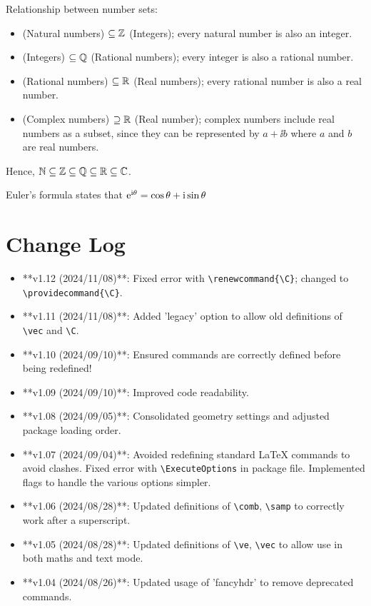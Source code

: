 \documentclass[twoside]{article}
\begin{document}
\begin{center}
    \begin{minipage}{0.7\textwidth}
        Relationship between number sets:
        \begin{itemize}
          \item \N{} (Natural numbers) $\subseteq \mathbb{Z}$ (Integers); every natural number is also an integer.
          \item \Z{} (Integers) $\subseteq \mathbb{Q}$ (Rational numbers); every integer is also a rational number.
          \item \Q{} (Rational numbers) $\subseteq \mathbb{R}$ (Real numbers); every rational number is also a real number.
          \item \Complex{} (Complex numbers) $\supseteq \mathbb{R}$ (Real number); complex numbers include real numbers as a subset, since they can be represented by $a+\ii b$ where $a$ and $b$ are real numbers.
        \end{itemize}
        Hence, $\mathbb{N}\subseteq\mathbb{Z}\subseteq\mathbb{Q}\subseteq\mathbb{R}\subseteq\mathbb{C}$.
        
        Euler's formula states that $\mathrm{e}^{\mathrm{i}\theta} = \cos\theta + \mathrm{i}\sin\theta$
    \end{minipage}
\end{center}
\section{Change Log}

\begin{itemize}
\item **v1.12 (2024/11/08)**: Fixed error with \verb|\renewcommand{\C}|; changed to \verb|\providecommand{\C}|.
\item **v1.11 (2024/11/08)**: Added 'legacy' option to allow old definitions of \verb|\vec| and \verb|\C|.
\item **v1.10 (2024/09/10)**: Ensured commands are correctly defined before being redefined!
\item **v1.09 (2024/09/10)**: Improved code readability.
\item **v1.08 (2024/09/05)**: Consolidated geometry settings and adjusted package loading order.
\item **v1.07 (2024/09/04)**: Avoided redefining standard LaTeX commands to avoid clashes. Fixed error with \verb|\ExecuteOptions| in package file. Implemented flags to handle the various options simpler.
\item **v1.06 (2024/08/28)**: Updated definitions of \verb|\comb|, \verb|\samp| to correctly work after a superscript.
\item **v1.05 (2024/08/28)**: Updated definitions of \verb|\ve|, \verb|\vec| to allow use in both maths and text mode.
\item **v1.04 (2024/08/26)**: Updated usage of 'fancyhdr' to remove deprecated commands.
\end{itemize}
\end{document}
